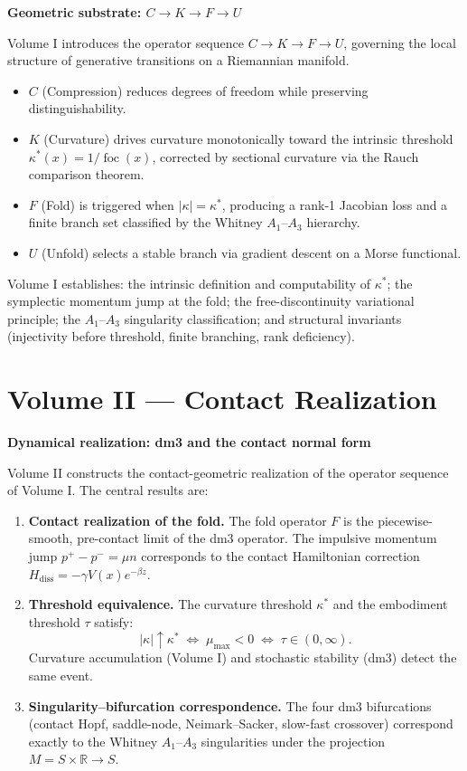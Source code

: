 \documentclass[12pt, oneside]{book}
\theoremstyle{plain}
\theoremstyle{definition}
\theoremstyle{remark}
\begin{document}
\textbf{Geometric substrate: $C \to K \to F \to U$}

\medskip\noindent
Volume I introduces the operator sequence
$C \longrightarrow K \longrightarrow F \longrightarrow U$,
governing the local structure of generative transitions on a Riemannian manifold.
\begin{itemize}
\item $C$ (Compression) reduces degrees of freedom while preserving
      distinguishability.
\item $K$ (Curvature) drives curvature monotonically toward the intrinsic
      threshold $\kappa^*(x) = 1/\operatorname{foc}(x)$, corrected by
      sectional curvature via the Rauch comparison theorem.
\item $F$ (Fold) is triggered when $|\kappa| = \kappa^*$, producing a
      rank-1 Jacobian loss and a finite branch set classified by the
      Whitney $A_1$--$A_3$ hierarchy.
\item $U$ (Unfold) selects a stable branch via gradient descent on a
      Morse functional.
\end{itemize}
Volume I establishes: the intrinsic definition and computability of $\kappa^*$;
the symplectic momentum jump at the fold; the free-discontinuity variational
principle; the $A_1$--$A_3$ singularity classification; and structural
invariants (injectivity before threshold, finite branching, rank deficiency).

\section*{Volume II --- Contact Realization}

\textbf{Dynamical realization: dm3 and the contact normal form}

\medskip\noindent
Volume II constructs the contact-geometric realization of the operator sequence
of Volume I. The central results are:
\begin{enumerate}[label=(\Alph*)]
\item \textbf{Contact realization of the fold.} The fold operator $F$ is the
piecewise-smooth, pre-contact limit of the dm3 operator. The impulsive momentum
jump $p^+ - p^- = \mu n$ corresponds to the contact Hamiltonian correction
$H_{\mathrm{diss}} = -\gamma V(x)e^{-\beta z}$.

\item \textbf{Threshold equivalence.} The curvature threshold $\kappa^*$ and
the embodiment threshold $\tau$ satisfy:
\[
|\kappa| \uparrow \kappa^*
\;\iff\; \mu_{\max} < 0
\;\iff\; \tau \in (0,\infty).
\]
Curvature accumulation (Volume I) and stochastic stability (dm3) detect
the same event.

\item \textbf{Singularity--bifurcation correspondence.} The four dm3
bifurcations (contact Hopf, saddle-node, Neimark--Sacker, slow-fast
crossover) correspond exactly to the Whitney $A_1$--$A_3$ singularities
under the projection $M = S \times \mathbb{R} \to S$.
\end{enumerate}
\end{document}
